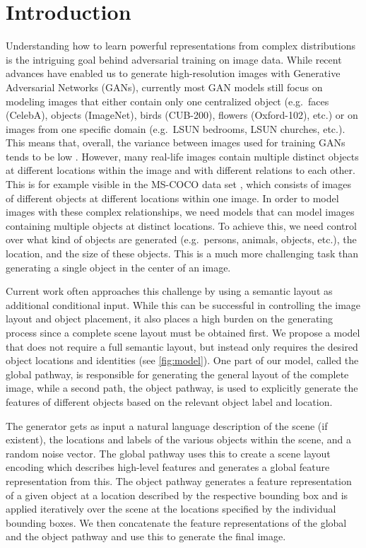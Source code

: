 \documentclass{article} \usepackage{iclr2019_conference,times}
\begin{document}
	\section{Introduction}
	Understanding how to learn powerful representations from complex distributions is the intriguing goal behind adversarial training on image data.
	While recent advances have enabled us to generate high-resolution images with Generative Adversarial Networks (GANs), currently most GAN models still focus on modeling images that either contain only one centralized object (e.g.\ faces (CelebA), objects (ImageNet), birds (CUB-200), flowers (Oxford-102), etc.) or on images from one specific domain (e.g.\ LSUN bedrooms, LSUN churches, etc.).
	This means that, overall, the variance between images used for training GANs tends to be low \citep{rajcompositional}.
	However, many real-life images contain multiple distinct objects at different locations within the image and with different relations to each other.
	This is for example visible in the MS-COCO data set \citep{lin2014microsoft}, which consists of images of different objects at different locations within one image.
	In order to model images with these complex relationships, we need models that can model images containing multiple objects at distinct locations.
	To achieve this, we need control over what kind of objects are generated (e.g.\ persons, animals, objects, etc.), the location, and the size of these objects.
	This is a much more challenging task than generating a single object in the center of an image.
	
	Current work \citep{karacan2016learning,johnson2018image,hong2018inferring,wang2018high} often approaches this challenge by using a semantic layout as additional conditional input.
	While this can be successful in controlling the image layout and object placement, it also places a high burden on the generating process since a complete scene layout must be obtained first.
We propose a model that does not require a full semantic layout, but instead only requires the desired object locations and identities (see \autoref{fig:model}).
	One part of our model, called the global pathway, is responsible for generating the general layout of the complete image, while a second path, the object pathway, is used to explicitly generate the features of different objects based on the relevant object label and location.
	
	The generator gets as input a natural language description of the scene (if existent), the locations and labels of the various objects within the scene, and a random noise vector.
	The global pathway uses this to create a scene layout encoding which describes high-level features and generates a global feature representation from this.
	The object pathway generates a feature representation of a given object at a location described by the respective bounding box and is applied iteratively over the scene at the locations specified by the individual bounding boxes.
	We then concatenate the feature representations of the global and the object pathway and use this to generate the final image.
	
\end{document}
